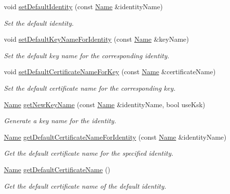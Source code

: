 \begin{DoxyCompactItemize}
void \hyperlink{classndn_1_1SecPublicInfo_a65ade0ac12e9c42f6c44c9a6757e05de}{set\+Default\+Identity} (const \hyperlink{classndn_1_1Name}{Name} \&identity\+Name)
\begin{DoxyCompactList}\small\item\em Set the default identity. \end{DoxyCompactList}\item 
void \hyperlink{classndn_1_1SecPublicInfo_a80d0038382466fa85876598ac2db48c8}{set\+Default\+Key\+Name\+For\+Identity} (const \hyperlink{classndn_1_1Name}{Name} \&key\+Name)
\begin{DoxyCompactList}\small\item\em Set the default key name for the corresponding identity. \end{DoxyCompactList}\item 
void \hyperlink{classndn_1_1SecPublicInfo_afd5bf4293133cd490d7dfadcc76e7eb6}{set\+Default\+Certificate\+Name\+For\+Key} (const \hyperlink{classndn_1_1Name}{Name} \&certificate\+Name)
\begin{DoxyCompactList}\small\item\em Set the default certificate name for the corresponding key. \end{DoxyCompactList}\item 
\hyperlink{classndn_1_1Name}{Name} \hyperlink{classndn_1_1SecPublicInfo_a1a6ee2d767a76f791fad7de74f20bd09}{get\+New\+Key\+Name} (const \hyperlink{classndn_1_1Name}{Name} \&identity\+Name, bool use\+Ksk)
\begin{DoxyCompactList}\small\item\em Generate a key name for the identity. \end{DoxyCompactList}\item 
\hyperlink{classndn_1_1Name}{Name} \hyperlink{classndn_1_1SecPublicInfo_abdd9810f11176a23d4c814f4a14bfd28}{get\+Default\+Certificate\+Name\+For\+Identity} (const \hyperlink{classndn_1_1Name}{Name} \&identity\+Name)
\begin{DoxyCompactList}\small\item\em Get the default certificate name for the specified identity. \end{DoxyCompactList}\item 
\hyperlink{classndn_1_1Name}{Name} \hyperlink{classndn_1_1SecPublicInfo_a0e63b76f281c36b955aed8782bd8cc0a}{get\+Default\+Certificate\+Name} ()
\begin{DoxyCompactList}\small\item\em Get the default certificate name of the default identity. \end{DoxyCompactList}\item 

\end{DoxyCompactItemize}
